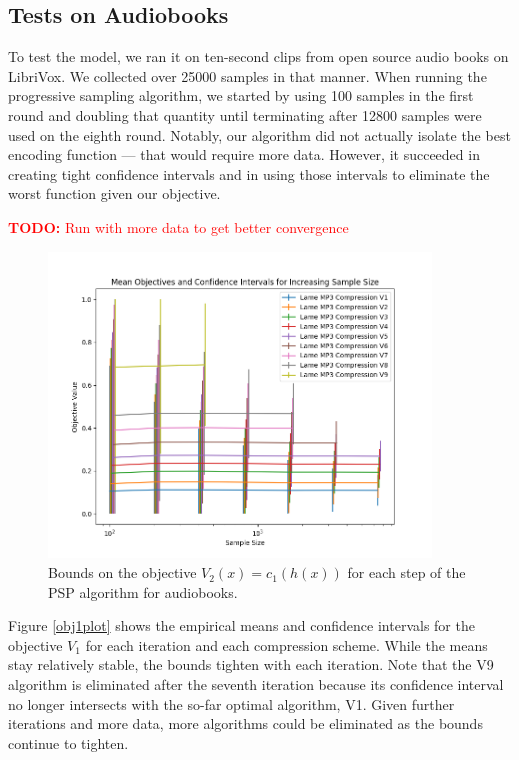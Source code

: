 \documentclass{article}
\newcommand\todo[1]{\textcolor{red}{\textbf{TODO:} #1}}
\begin{document}
{\subsection{Tests on Audiobooks}

To test the model, we ran it on ten-second clips from open source audio books on LibriVox\citep{mcguire}. We collected over 25000 samples in that manner. When running the progressive sampling algorithm, we started by using 100 samples in the first round and doubling that quantity until terminating after 12800 samples were used on the eighth round. Notably, our algorithm did not actually isolate the best encoding function --- that would require more data. However, it succeeded in creating tight confidence intervals and in using those intervals to eliminate the worst function given our objective.

\todo{Run with more data to get better convergence}

\begin{figure}
    \centering
    \includegraphics[width=4in]{codec_figures/obj2plot_py.png}
    \caption{Bounds on the objective $V_2(x) =  c_1(h(x))$ for each step of the PSP algorithm for audiobooks.}
    \label{obj2plot}
\end{figure}

Figure \ref{obj1plot} shows the empirical means and confidence intervals for the objective $V_1$ for each iteration and each compression scheme. While the means stay relatively stable, the bounds tighten with each iteration. Note that the V9 algorithm is eliminated after the seventh iteration because its confidence interval no longer intersects with the so-far optimal algorithm, V1. Given further iterations and more data, more algorithms could be eliminated as the bounds continue to tighten.

}
\end{document}
